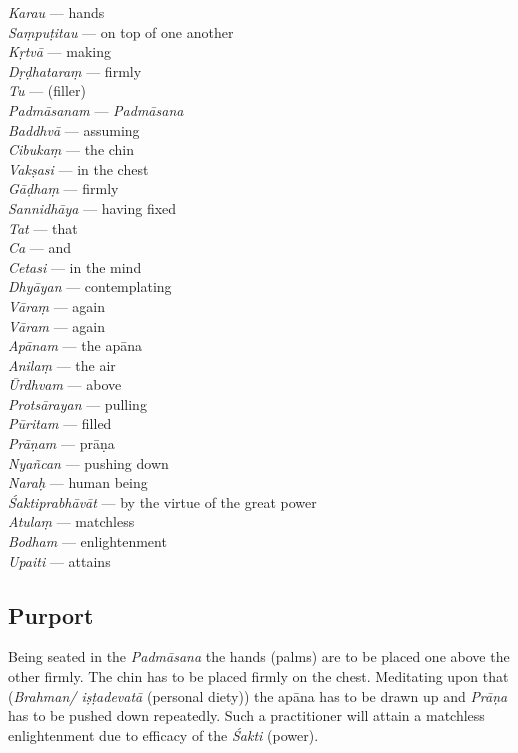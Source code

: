 \begin{multicols}{2}
\textit{Karau}  ---  hands \\
\textit{Saṃpuṭitau} ---  on top of one another \\
\textit{Kṛtvā} ---  making \\
\textit{Dṛḍhataraṃ} ---  firmly \\
\textit{Tu} ---  (filler)  \\
\textit{Padmāsanam} ---  \textit{Padmāsana} \\
\textit{Baddhvā} ---  assuming  \\
\textit{Cibukaṃ} ---  the chin  \\
\textit{Vakṣasi} ---  in the chest \\ 
\textit{Gāḍhaṃ} ---  firmly  \\
\textit{Sannidhāya} ---  having fixed  \\
\textit{Tat} --- that  \\
\textit{Ca} ---   and  \\
\textit{Cetasi} --- in the mind   \\
\textit{Dhyāyan} ---  contemplating \\  
\textit{Vāraṃ} ---  again  \\
\textit{Vāram} ---  again  \\
\textit{Apānam} ---  the apāna \\
\textit{Anilaṃ} ---  the air  \\
\textit{Ūrdhvam} ---  above  \\
\textit{Protsārayan} ---  pulling  \\
\textit{Pūritam} ---  filled  \\
\textit{Prāṇam} ---  prāṇa \\
\textit{Nyañcan} ---  pushing down  \\
\textit{Naraḥ} --- human being  \\
\textit{Śaktiprabhāvāt} ---  by the virtue of the great power  \\
\textit{Atulaṃ} ---  matchless  \\
\textit{Bodham} ---  enlightenment  \\
\textit{Upaiti} ---  attains
\end{multicols}

\subsection*{Purport}

Being seated in the \textit{Padmāsana} the hands (palms) are to be placed one above the other firmly. The chin has to be placed firmly on the chest. Meditating upon that (\textit{Brahman/ iṣṭadevatā} (personal diety)) the apāna has to be drawn up and \textit{Prāṇa} has to be pushed down repeatedly. Such a practitioner will attain a matchless enlightenment due to efficacy of the \textit{Śakti} (power).

